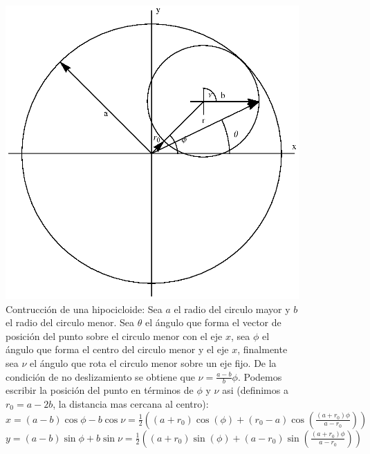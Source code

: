 \begin{figure}
\centering
\includegraphics[width=0.9 \textwidth]{dib.eps}
\caption{Contrucci\'on de una hipocicloide: Sea $a$ el radio del circulo mayor y $b$ el radio del circulo menor. Sea $\theta$ el \'angulo que forma el vector de posici\'on del punto sobre el circulo menor con el eje $x$, sea $\phi$ el \'angulo que forma el centro del circulo menor y el eje $x$, finalmente sea $\nu$ el \'angulo que rota el circulo menor sobre un eje fijo. De la condici\'on de no deslizamiento se obtiene que $\nu=\frac{a-b}{b} \phi$. Podemos escribir la posici\'on del punto en t\'erminos de $\phi$ y $\nu$ asi (definimos a $r_0=a-2b$, la distancia mas cercana al centro):
$x=(a-b)\cos \phi-b \cos \nu=\frac{1}{2}\left((a+r_0) \cos (\phi)+(r_0-a) \cos \left(\frac{(a+r_0) \phi}{a-r_0}\right)\right)$
$y=(a-b)\sin \phi+b \sin \nu=\frac{1}{2}\left((a+r_0) \sin (\phi)+(a-r_0) \sin \left(\frac{(a+r_0) \phi}{a-r_0} \right)\right)$}
\label{a}
\end{figure}


